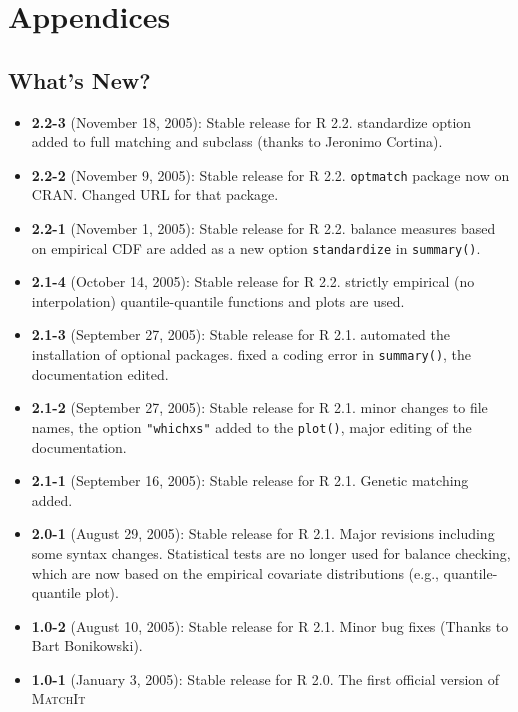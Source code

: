 \documentclass[oneside,letterpaper,12pt]{book}
\newcommand{\MatchIt}{\textsc{MatchIt}}
\begin{document}

\chapter{Appendices}

\section{What's New?}

\begin{itemize}
\item \textbf{2.2-3} (November 18, 2005): Stable release for R 2.2.
  standardize option added to full matching and subclass (thanks to
  Jeronimo Cortina).
\item \textbf{2.2-2} (November 9, 2005): Stable release for R 2.2.
  {\tt optmatch} package now on CRAN. Changed URL for that package. 
\item \textbf{2.2-1} (November 1, 2005): Stable release for R 2.2.
  balance measures based on empirical CDF are added as a new option
  {\tt standardize} in {\tt summary()}.
\item \textbf{2.1-4} (October 14, 2005): Stable release for R 2.2.
  strictly empirical (no interpolation) quantile-quantile functions
  and plots are used.
\item \textbf{2.1-3} (September 27, 2005): Stable release for R 2.1.
  automated the installation of optional packages. fixed a coding
  error in {\tt summary()}, the documentation edited.
\item \textbf{2.1-2} (September 27, 2005): Stable release for R 2.1.
  minor changes to file names, the option {\tt "whichxs"} added to the
  {\tt plot()}, major editing of the documentation.
\item \textbf{2.1-1} (September 16, 2005): Stable release for R
        2.1. Genetic matching added.    
\item \textbf{2.0-1} (August 29, 2005): Stable release for R 2.1.
  Major revisions including some syntax changes. Statistical tests are
  no longer used for balance checking, which are now based on the
  empirical covariate distributions (e.g., quantile-quantile plot).
\item \textbf{1.0-2} (August 10, 2005): Stable release for R
  2.1. Minor bug fixes (Thanks to Bart Bonikowski).
\item \textbf{1.0-1} (January 3, 2005): Stable release for R 2.0. The
  first official version of \MatchIt
\end{itemize}
\end{document}
